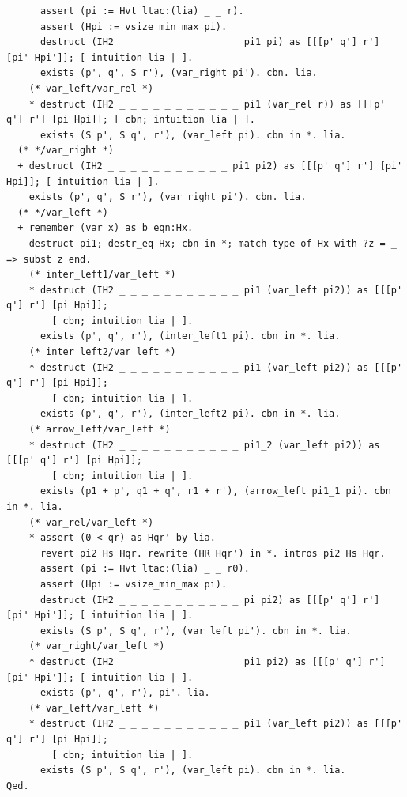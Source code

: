 \begin{lstlisting}
      assert (pi := Hvt ltac:(lia) _ _ r).
      assert (Hpi := vsize_min_max pi).
      destruct (IH2 _ _ _ _ _ _ _ _ _ _ _ pi1 pi) as [[[p' q'] r'] [pi' Hpi']]; [ intuition lia | ].
      exists (p', q', S r'), (var_right pi'). cbn. lia.
    (* var_left/var_rel *)
    * destruct (IH2 _ _ _ _ _ _ _ _ _ _ _ pi1 (var_rel r)) as [[[p' q'] r'] [pi Hpi]]; [ cbn; intuition lia | ].
      exists (S p', S q', r'), (var_left pi). cbn in *. lia.
  (* */var_right *)
  + destruct (IH2 _ _ _ _ _ _ _ _ _ _ _ pi1 pi2) as [[[p' q'] r'] [pi' Hpi]]; [ intuition lia | ].
    exists (p', q', S r'), (var_right pi'). cbn. lia.
  (* */var_left *)
  + remember (var x) as b eqn:Hx.
    destruct pi1; destr_eq Hx; cbn in *; match type of Hx with ?z = _ => subst z end.
    (* inter_left1/var_left *)
    * destruct (IH2 _ _ _ _ _ _ _ _ _ _ _ pi1 (var_left pi2)) as [[[p' q'] r'] [pi Hpi]];
        [ cbn; intuition lia | ].
      exists (p', q', r'), (inter_left1 pi). cbn in *. lia.
    (* inter_left2/var_left *)
    * destruct (IH2 _ _ _ _ _ _ _ _ _ _ _ pi1 (var_left pi2)) as [[[p' q'] r'] [pi Hpi]];
        [ cbn; intuition lia | ].
      exists (p', q', r'), (inter_left2 pi). cbn in *. lia.
    (* arrow_left/var_left *)
    * destruct (IH2 _ _ _ _ _ _ _ _ _ _ _ pi1_2 (var_left pi2)) as [[[p' q'] r'] [pi Hpi]];
        [ cbn; intuition lia | ].
      exists (p1 + p', q1 + q', r1 + r'), (arrow_left pi1_1 pi). cbn in *. lia.
    (* var_rel/var_left *)
    * assert (0 < qr) as Hqr' by lia.
      revert pi2 Hs Hqr. rewrite (HR Hqr') in *. intros pi2 Hs Hqr.
      assert (pi := Hvt ltac:(lia) _ _ r0).
      assert (Hpi := vsize_min_max pi).
      destruct (IH2 _ _ _ _ _ _ _ _ _ _ _ pi pi2) as [[[p' q'] r'] [pi' Hpi']]; [ intuition lia | ].
      exists (S p', S q', r'), (var_left pi'). cbn in *. lia.
    (* var_right/var_left *)
    * destruct (IH2 _ _ _ _ _ _ _ _ _ _ _ pi1 pi2) as [[[p' q'] r'] [pi' Hpi']]; [ intuition lia | ].
      exists (p', q', r'), pi'. lia.
    (* var_left/var_left *)
    * destruct (IH2 _ _ _ _ _ _ _ _ _ _ _ pi1 (var_left pi2)) as [[[p' q'] r'] [pi Hpi]];
        [ cbn; intuition lia | ].
      exists (S p', S q', r'), (var_left pi). cbn in *. lia.
Qed.
\end{lstlisting}

